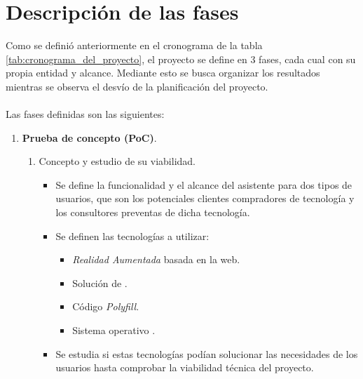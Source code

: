 \documentclass{subfiles}
\begin{document}
        \section{Descripción de las fases}
        \label{sec:descripcion_de_las_fases}
        Como se definió anteriormente en el cronograma de la tabla \ref{tab:cronograma_del_proyecto}, el proyecto se define en 3 fases, cada cual con su propia entidad y alcance. Mediante esto se busca organizar los resultados mientras se observa el desvío de la planificación del proyecto.

        \paragraph{}
        Las fases definidas son las siguientes:

        \begin{enumerate}
            \item \textbf{Prueba de concepto (PoC)}.

            \begin{enumerate}
                \item Concepto y estudio de su viabilidad.
                \begin{itemize}
                    \item Se define la funcionalidad y el alcance del asistente para dos tipos de usuarios, que son los potenciales clientes compradores de tecnología y los consultores preventas de dicha tecnología.
                    \item Se definen las tecnologías a utilizar:
                    \begin{itemize}
                        \item \textit{Realidad Aumentada} basada en la web.
                        \item Solución de \ra \webxr.
                        \item Código \textit{Polyfill}.
                        \item Sistema operativo \android.
                    \end{itemize}
                    \item Se estudia si estas tecnologías podían solucionar las necesidades de los usuarios hasta comprobar la viabilidad técnica del proyecto.
                \end{itemize}


\end{enumerate}
\end{enumerate}
\end{document}
